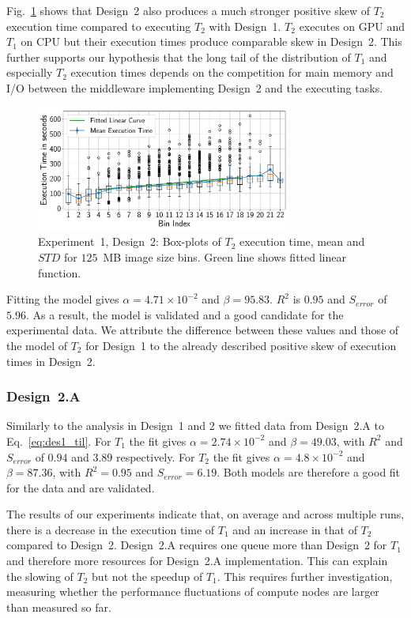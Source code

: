 Fig.~\ref{fig:stage_2_execution_des2} shows that Design~2 also produces a much stronger positive skew of $T_{2}$ execution time compared to executing $T_{2}$ with Design~1.
$T_{2}$ executes on GPU and $T_{1}$ on CPU but their execution times produce comparable skew in Design~2.
This further supports our hypothesis that the long tail of the distribution of $T_{1}$ and especially $T_{2}$ execution times depends on the competition for main memory and I/O between the middleware implementing Design~2 and the executing tasks.


\begin{figure}[H]
    \centering
    \includegraphics[width=0.75\textwidth]{figures/designs/stage_1_tx_box_des2.pdf}
    \caption{Experiment~1, Design~2: Box-plots of $T_{2}$ execution time, mean and $STD$ for $125$~MB image size bins.
        Green line shows fitted linear function.}\label{fig:stage_2_execution_des2}
\end{figure}


Fitting the model gives $\alpha = 4.71 \times 10^{-2}$ and $\beta = 95.83$.
$R^{2}$ is $0.95$ and $S_{error}$ of $5.96$.
As a result, the model is validated and a good candidate for the experimental data.
We attribute the difference between these values and those of the model of $T_{2}$ for Design~1 to the already described positive skew of execution times in Design~2.

\subsubsection{Design~2.A} Similarly to the analysis in Design~1 and 2 we fitted data from Design~2.A to Eq.~\ref{eq:des1_til}.
For $T_{1}$ the fit gives $\alpha=2.74\times10^{-2}$ and $\beta=49.03$, with $R^{2}$ and $S_{error}$ of $0.94$ and $3.89$ respectively.
For $T_{2}$ the fit gives $\alpha=4.8\times10^{-2}$ and $\beta=87.36$, with $R^{2}=0.95$ and $S_{error}=6.19$.
Both models are therefore a good fit for the data and are validated.

The results of our experiments indicate that, on average and across multiple runs, there is a decrease in the execution time of $T_{1}$ and an increase in that of $T_{2}$ compared to Design~2.
Design~2.A requires one queue more than Design~2 for $T_{1}$ and therefore more resources for Design~2.A implementation.
This can explain the slowing of $T_{2}$ but not the speedup of $T_{1}$.
This requires further investigation, measuring whether the performance fluctuations of compute nodes are larger than measured so far.


